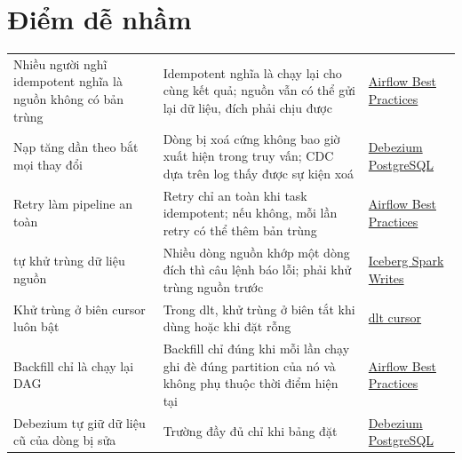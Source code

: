 \section{Điểm dễ nhầm}
\begin{xltabular}{\textwidth}{@{}P{4.2cm} L P{3.4cm}@{}}
\toprule
{} &  &  \\
\midrule
\endhead
\bottomrule
\endfoot
Nhiều người nghĩ idempotent nghĩa là nguồn không có bản trùng & Idempotent nghĩa là chạy lại cho cùng kết quả; nguồn vẫn có thể gửi lại dữ liệu, đích phải chịu được & \href{https://airflow.apache.org/docs/apache-airflow/stable/best-practices.html}{Airflow Best Practices} \\
Nạp tăng dần theo  bắt mọi thay đổi & Dòng bị xoá cứng không bao giờ xuất hiện trong truy vấn; CDC dựa trên log thấy được sự kiện xoá & \href{https://debezium.io/documentation/reference/stable/connectors/postgresql.html}{Debezium PostgreSQL} \\
Retry làm pipeline an toàn & Retry chỉ an toàn khi task idempotent; nếu không, mỗi lần retry có thể thêm bản trùng & \href{https://airflow.apache.org/docs/apache-airflow/stable/best-practices.html}{Airflow Best Practices} \\
 tự khử trùng dữ liệu nguồn & Nhiều dòng nguồn khớp một dòng đích thì câu lệnh báo lỗi; phải khử trùng nguồn trước & \href{https://iceberg.apache.org/docs/latest/spark-writes/}{Iceberg Spark Writes} \\
Khử trùng ở biên cursor luôn bật & Trong dlt, khử trùng ở biên tắt khi dùng  hoặc khi đặt  rỗng & \href{https://dlthub.com/docs/general-usage/incremental/cursor}{dlt cursor} \\
Backfill chỉ là chạy lại DAG & Backfill chỉ đúng khi mỗi lần chạy ghi đè đúng partition của nó và không phụ thuộc thời điểm hiện tại & \href{https://airflow.apache.org/docs/apache-airflow/stable/best-practices.html}{Airflow Best Practices} \\
Debezium tự giữ dữ liệu cũ của dòng bị sửa & Trường  đầy đủ chỉ khi bảng đặt  & \href{https://debezium.io/documentation/reference/stable/connectors/postgresql.html}{Debezium PostgreSQL} \\
\end{xltabular}
